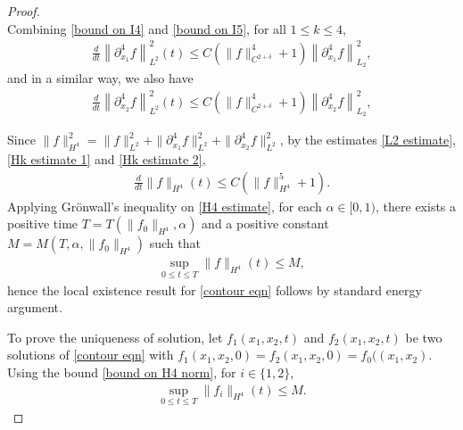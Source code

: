 \documentclass[reqno]{amsart}%
\theoremstyle{definition}
\theoremstyle{remark}
\numberwithin{equation}{section}
\newcommand{\0}{\mathbf{0}}
\newcommand{\1}{\mathbf{1}}
\numberwithin{equation}{section}
\numberwithin{theorem}{section}
\numberwithin{figure}{section}
\begin{document}
\begin{proof}
\begin{equation}
\end{equation}
Combining \eqref{bound on I4} and \eqref{bound on I5}, for all $1\le k\le 4$,
\begin{align}\label{Hk estimate 1}
\frac{d}{dt}  \left\|\partial_{x_1}^4 f\right\|_{L^2}^2(t) \leq C (\|f\|_{C^{2+ \delta}}^4+1)\left\|\partial_{x_1}^4 f \right\|_{L_2}^2,
\end{align}
and in a similar way, we also have
\begin{align}\label{Hk estimate 2}
\frac{d}{dt}  \left\|\partial_{x_2}^4 f\right\|_{L^2}^2(t) \leq C (\|f\|_{C^{2+ \delta}}^4+1)\left\|\partial_{x_2}^4 f \right\|_{L_2}^2,
\end{align}

Since $\|f\|^2_{H^4}=\|f\|^2_{L^2}+\|\partial_{x_1}^4 f\|_{L^2}^2+\|\partial_{x_2}^4 f\|_{L^2}^2$, by the estimates \eqref{L2 estimate}, \eqref{Hk estimate 1} and \eqref{Hk estimate 2},
\begin{align}\label{H4 estimate}
\frac{d}{dt}\|f\|_{H^4}(t)\le C(\|f\|_{H^4}^5+1).
\end{align}
Applying Gr\"{o}nwall's inequality on \eqref{H4 estimate}, for each $\alpha\in[0,1)$, there exists a positive time $T=T(\|f_0\|_{H^4},\alpha)$ and a positive constant $M=M(T,\alpha,\|f_0\|_{H^4})$ such that
\begin{align}\label{bound on H4 norm}
\sup_{0\le t\le T}\|f\|_{H^4}(t)\le M,
\end{align}
hence the local existence result for \eqref{contour eqn} follows by standard energy argument.

To prove the uniqueness of solution, let $f_1(x_1,x_2,t)$ and $f_2(x_1,x_2,t)$ be two solutions of \eqref{contour eqn} with $f_1(x_1,x_2,0)=f_2(x_1,x_2,0)=f_0((x_1,x_2)$. Using the bound \eqref{bound on H4 norm}, for $i\in\{1,2\}$,
\begin{align}\label{bound on f1 f2}
\sup_{0\le t\le T}\|f_i\|_{H^4}(t)\le M.
\end{align}


\end{proof}
\end{document}
